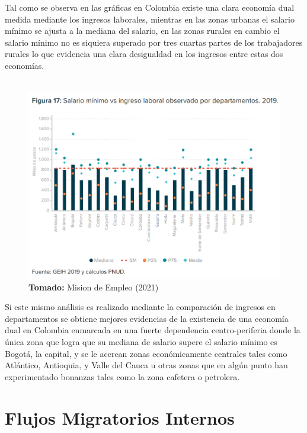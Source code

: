 \documentclass[12pt,letterpaper]{article}
\newcommand*{\captionsource}[2]{%
    \textbf{\\Tomado:} #2%
  }%
\begin{document}
\begin{flushleft}
Tal como se observa en las gráficas en Colombia existe una clara economía dual medida mediante los ingresos laborales, mientras en las zonas urbanas el salario mínimo se ajusta a la mediana del salario,
en las zonas rurales en cambio el salario mínimo no es siquiera superado por tres cuartas partes de los trabajadores rurales lo que evidencia una clara desigualdad en los ingresos entre estas dos economías.\\
~\\
\begin{figure}[h!]
    \centering
    \includegraphics[scale=0.5]{ingdepto.png}
    \captionsource{Caption}{Mision de Empleo (2021)}
\end{figure}

Si este mismo análisis es realizado mediante la comparación de ingresos en departamentos se obtiene mejores evidencias de la existencia de una economía dual en Colombia enmarcada en una fuerte dependencia
centro-periferia donde la única zona que logra que su mediana de salario supere el salario mínimo es Bogotá, la capital, y se le acercan zonas económicamente centrales tales como Atlántico, Antioquia, y Valle del Cauca u otras zonas que en algún punto
han experimentado bonanzas tales como la zona cafetera o petrolera.\\
\end{flushleft}

\newpage

\section{Flujos Migratorios Internos}
\end{document}

